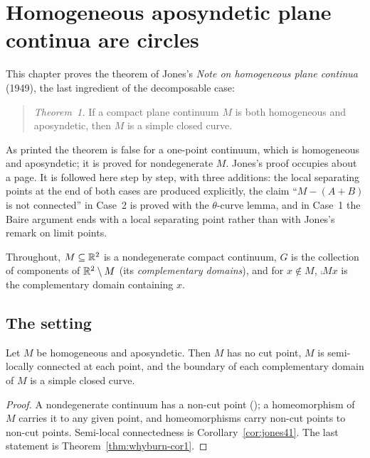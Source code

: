 \chapter{Homogeneous aposyndetic plane continua are circles}\label{ch:jones49}

This chapter proves the theorem of Jones's \emph{Note on homogeneous plane continua} (1949), the last
ingredient of the decomposable case:

\begin{quote}
\emph{Theorem~1.} If a compact plane continuum $M$ is both homogeneous and aposyndetic, then $M$ is a simple
closed curve.
\end{quote}

As printed the theorem is false for a one-point continuum, which is homogeneous and aposyndetic; it is proved
for nondegenerate $M$. Jones's proof occupies about a page. It is followed here step by step, with three
additions: the local separating points at the end of both cases are produced explicitly, the claim ``$M-(A+B)$ is
not connected'' in Case~2 is proved with the $\theta$-curve lemma, and in Case~1 the Baire argument ends with a
local separating point rather than with Jones's remark on limit points.

Throughout, $M\subseteq\mathbb{R}^2$ is a nondegenerate compact continuum, $G$ is the collection of components of $\mathbb{R}^2\setminus M$
(its \emph{complementary domains}), and for $x\notin M$, $\comp Mx$ is the complementary domain containing $x$.


\section{The setting}

\begin{lemma}[Jones 1949, p.~113]\label{lem:jones49-setting}
Let $M$ be homogeneous and aposyndetic. Then $M$ has no cut point, $M$ is semi-locally connected at each point, and the boundary of each complementary
domain of $M$ is a simple closed curve.
\end{lemma}

\begin{proof}
A nondegenerate continuum has a non-cut point (); a homeomorphism of $M$ carries it to any given point, and homeomorphisms carry
non-cut points to non-cut points. Semi-local connectedness is Corollary~\ref{cor:jones41}. The last statement is Theorem~\ref{thm:whyburn-cor1}.
\end{proof}

